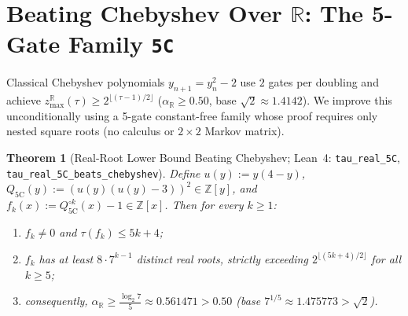 \documentclass[11pt]{article}
\newtheorem{theorem}{Theorem}[section]
\newcommand{\Z}{\mathbb{Z}}
\newcommand{\R}{\mathbb{R}}
\newcommand{\code}[1]{\texttt{#1}}
\newcommand{\zmax}{z_{\max}}
\begin{document}
\section{Beating Chebyshev Over $\R$: The 5-Gate Family \code{5C}}

Classical Chebyshev polynomials $y_{n+1} = y_n^2 - 2$ use $2$ gates per doubling and achieve $\zmax^{\R}(\tau) \ge 2^{\lfloor(\tau-1)/2\rfloor}$ ($\alpha_{\R} \ge 0.50$, base $\sqrt{2} \approx 1.4142$). We improve this unconditionally using a 5-gate constant-free family whose proof requires only nested square roots (no calculus or $2 \times 2$ Markov matrix).

\begin{theorem}[Real-Root Lower Bound Beating Chebyshev; Lean~4: \code{tau\_real\_5C}, \code{tau\_real\_5C\_}\allowbreak\code{beats\_chebyshev}]
\label{thm:real-5c}
Define $u(y) := y(4 - y)$, $Q_{\mathrm{5C}}(y) := (u(y)(u(y) - 3))^2 \in \Z[y]$, and $f_k(x) := Q_{\mathrm{5C}}^{\circ k}(x) - 1 \in \Z[x]$. Then for every $k \ge 1$:
\begin{enumerate}[label=(\alph*),leftmargin=1.8em]
  \item $f_k \neq 0$ and $\tau(f_k) \le 5k + 4$;
  \item $f_k$ has at least $8 \cdot 7^{k-1}$ distinct real roots, strictly exceeding $2^{\lfloor(5k+4)/2\rfloor}$ for all $k \ge 5$;
  \item consequently, $\alpha_{\R} \ge \frac{\log_2 7}{5} \approx 0.561471 > 0.50$ (base $7^{1/5} \approx 1.475773 > \sqrt{2}$).
\end{enumerate}
\end{theorem}
\end{document}
